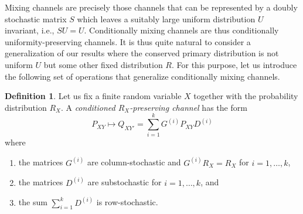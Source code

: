 \documentclass[aps,pra,11pt,onecolumn,nofootinbib,tightenlines]{revtex4-2}
\theoremstyle{definition}
\newtheorem{definition}[theorem]{Definition}
\begin{document}
Mixing channels are precisely those channels that can be represented by a doubly stochastic matrix $S$ which leaves a suitably large uniform distribution $U$ invariant, i.e., $S U = U$.
Conditionally mixing channels are thus conditionally uniformity-preserving channels. It is thus quite natural to consider a generalization of our results where the conserved primary distribution is not uniform $U$ but some other fixed distribution $R$. For this purpose, let us introduce the following set of operations that generalize conditionally mixing channels.

\begin{definition}
Let us fix a finite random variable $X$ together with the probability distribution $R_X$. A \textit{conditioned $R_X$-preserving channel} has the form
\begin{equation}
P_{XY}\mapsto Q_{XY'}=\sum_{i=1}^k G^{(i)}P_{XY}D^{(i)}
\end{equation}
where
\begin{enumerate}
\item the matrices $G^{(i)}$ are column-stochastic and $G^{(i)}R_X=R_X$ for $i=1,\ldots,k$,
\item the matrices $D^{(i)}$ are substochastic for $i=1,\ldots,k$, and
\item the sum $\sum_{i=1}^k D^{(i)}$ is row-stochastic.
\end{enumerate}
\end{definition}
\end{document}
